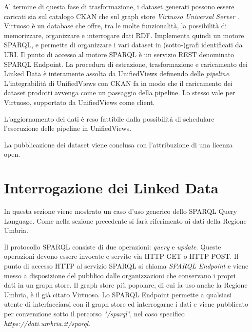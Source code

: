 Al termine di questa fase di trasformazione, i dataset generati possono essere caricati sia sul catalogo CKAN che sul graph store \textit{Virtuoso Universal Server} \cite{virtuoso}. Virtuoso è un database che offre, tra le molte funzionalità, la possibilità di memorizzare, organizzare e interrogare dati RDF. Implementa quindi un motore SPARQL, e permette di organizzare i vari dataset in (sotto-)grafi identificati da URI. Il punto di accesso al motore SPARQL è un servizio REST denominato SPARQL Endpoint. 
La procedura di estrazione, trasformazione e caricamento dei Linked Data è interamente assolta da UnifiedViews definendo delle \textit{pipeline}. L'integrabilità di UnifiedViews con CKAN fa in modo che il caricamento dei dataset prodotti avvenga come un passaggio della pipeline. Lo stesso vale per Virtuoso, supportato da UnifiedViews come client. 

L'aggiornamento dei dati è reso fattibile dalla possibilità di schedulare l'esecuzione delle pipeline in UnifiedViews.

La pubblicazione dei dataset viene conclusa con l'attribuzione di una licenza open.

\section{Interrogazione dei Linked Data}
\label{sec:intro:sparql}



In questa sezione viene mostrato un caso d'uso generico dello SPARQL Query Language. Come nella sezione precedente si farà riferimento ai dati della Regione Umbria.

Il protocollo SPARQL consiste di due operazioni: \textit{query} e \textit{update}. Queste operazioni devono essere invocate e servite via HTTP GET o HTTP POST. Il punto di accesso HTTP al servizio SPARQL si chiama \textit{SPARQL Endpoint} e viene messo a disposizione del pubblico dalle organizzazioni che conservano i propri dati in un graph store. Il graph store più popolare, di cui fa uso anche la Regione Umbria, è il già citato Virtuoso. Lo SPARQL Endpoint permette a qualsiasi utente di interfacciarsi con il graph store ed interrogarne i dati e viene pubblicato per convenzione sotto il percorso \textit{"/sparql"}, nel caso specifico \textit{https://dati.umbria.it/sparql}.

